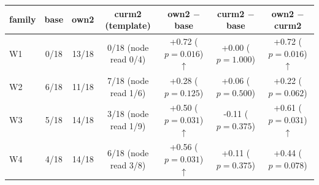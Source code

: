\begin{tabular}{lcccccc}
\toprule
family & base & own2 & curm2 (template) & own2 $-$ base & curm2 $-$ base & own2 $-$ curm2 \\
\midrule
W1 & 0/18 & 13/18 & 0/18 (node read 0/4) & +0.72 ($p=0.016$)$\uparrow$ & +0.00 ($p=1.000$) & +0.72 ($p=0.016$)$\uparrow$ \\
W2 & 6/18 & 11/18 & 7/18 (node read 1/6) & +0.28 ($p=0.125$) & +0.06 ($p=0.500$) & +0.22 ($p=0.062$) \\
W3 & 5/18 & 14/18 & 3/18 (node read 1/9) & +0.50 ($p=0.031$)$\uparrow$ & -0.11 ($p=0.375$) & +0.61 ($p=0.031$)$\uparrow$ \\
W4 & 4/18 & 14/18 & 6/18 (node read 3/8) & +0.56 ($p=0.031$)$\uparrow$ & +0.11 ($p=0.375$) & +0.44 ($p=0.078$) \\
\bottomrule
\end{tabular}
